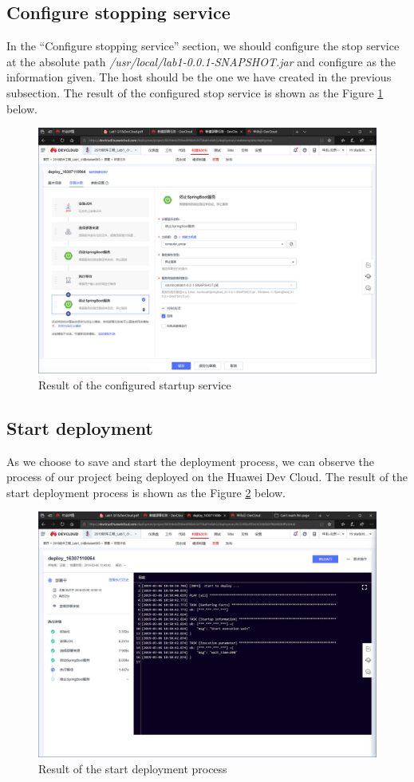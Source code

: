 \documentclass[a4paper]{report}
\begin{document}
\subsection{Configure stopping service}
In the ``Configure stopping service'' section, we should configure the stop service at the absolute path \emph{/usr/local/lab1-0.0.1-SNAPSHOT.jar} and configure as the information given. The host should be the one we have created in the previous subsection. The result of the configured stop service is shown as the Figure \ref{12} below.
\par
\begin{figure}
  \centering
  \includegraphics[width=12cm]{Figures/Capture9.png}
  \caption{Result of the configured startup service}\label{12}
\end{figure}
\par
\subsection{Start deployment}
As we choose to save and start the deployment process, we can observe the process of our project being deployed on the Huawei Dev Cloud.  The result of the start deployment process is shown as the Figure \ref{13} below.
\begin{figure}
  \centering
  \includegraphics[width=12cm]{Figures/Capture10.png}
  \caption{Result of the start deployment process}\label{13}
\end{figure}
\end{document}
